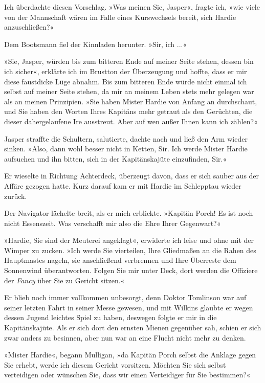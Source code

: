Ich überdachte diesen Vorschlag. »Was meinen Sie, Jasper«, fragte
ich, »wie viele von der Mannschaft wären im Falle eines
Kurswechsels bereit, sich Hardie anzuschließen?«

Dem Bootsmann fiel der Kinnladen herunter. »Sir, ich ...«

»Sie, Jasper, würden bis zum bitteren Ende auf meiner Seite stehen,
dessen bin ich sicher«, erklärte ich im Brustton der Überzeugung
und hoffte, dass er mir diese faustdicke Lüge abnahm. Bis zum
bitteren Ende würde nicht einmal ich selbst auf meiner Seite
stehen, da mir an meinem Leben stets mehr gelegen war als an meinen
Prinzipien. »Sie haben Mister Hardie von Anfang an durchschaut, und
Sie haben den Worten Ihres Kapitäns mehr getraut als den Gerüchten,
die dieser dahergelaufene Ire ausstreut. Aber auf wen außer Ihnen
kann ich zählen?«

Jasper straffte die Schultern, salutierte, dachte nach und ließ den
Arm wieder sinken. »Also, dann wohl besser nicht in Ketten, Sir.
Ich werde Mister Hardie aufsuchen und ihn bitten, sich in der
Kapitänskajüte einzufinden, Sir.«

Er wieselte in Richtung Achterdeck, überzeugt davon, dass er sich
sauber aus der Affäre gezogen hatte. Kurz darauf kam er mit Hardie
im Schlepptau wieder zurück.

\bigpar

Der Navigator lächelte breit, als er mich erblickte. »Kapitän
Porch! Es ist noch nicht Essenszeit. Was verschafft mir also die
Ehre Ihrer Gegenwart?«

»Hardie, Sie sind der Meuterei angeklagt«, erwiderte ich leise und
ohne mit der Wimper zu zucken. »Ich werde Sie vierteilen, Ihre
Gliedmaßen an die Rahen des Hauptmastes nageln, sie anschließend
verbrennen und Ihre Überreste dem Sonnenwind überantworten. Folgen
Sie mir unter Deck, dort werden die Offiziere der \emph{Fancy} über
Sie zu Gericht sitzen.«

Er blieb noch immer vollkommen unbesorgt, denn Doktor Tomlinson war
auf seiner letzten Fahrt in seiner Messe gewesen, und mit Wilkins
glaubte er wegen dessen Jugend leichtes Spiel zu haben, deswegen
folgte er mir in die Kapitänskajüte. Als er sich dort den ernsten
Mienen gegenüber sah, schien er sich zwar anders zu besinnen, aber
nun war an eine Flucht nicht mehr zu denken.

»Mister Hardie«, begann Mulligan, »da Kapitän Porch selbst die
Anklage gegen Sie erhebt, werde ich diesem Gericht vorsitzen.
Möchten Sie sich selbst verteidigen oder wünschen Sie, dass wir
einen Verteidiger für Sie bestimmen?«


